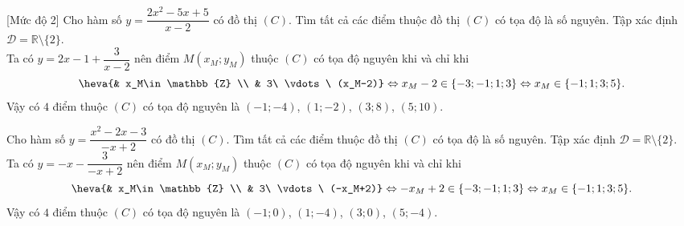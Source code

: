 \begin{bt}%
[Mức độ 2]%
Cho hàm số $y=\dfrac{2x^2-5x+5}{x-2}$ có đồ thị $(C)$. Tìm tất cả các điểm thuộc đồ thị $(C)$ có tọa độ là số nguyên.
\loigiai
{Tập xác định $\mathscr{D}=\mathbb{R}\setminus\{2\}$.\\
Ta có $y=2x-1+\dfrac{3}{x-2}$ nên điểm $M(x_M;y_M)$ thuộc $(C)$ có tọa độ nguyên khi và chỉ khi \[\heva{& x_M\in\mathbb{Z} \\ & 3\ \vdots\ (x_M-2)}\Leftrightarrow x_M-2\in\{-3;-1;1;3\}\Leftrightarrow x_M\in\{-1;1;3;5\}.
\]
Vậy có $4$ điểm thuộc $(C)$ có tọa độ nguyên là $(-1;-4)$, $(1;-2)$, $(3;8)$, $(5;10)$.
}
\end{bt}

\begin{bt}%
Cho hàm số $y=\dfrac{x^2-2x-3}{-x+2}$ có đồ thị $(C)$. Tìm tất cả các điểm thuộc đồ thị $(C)$ có tọa độ là số nguyên.
\loigiai
{Tập xác định $\mathscr{D}=\mathbb{R}\setminus\{2\}$.\\
Ta có $y=-x-\dfrac{3}{-x+2}$ nên điểm $M(x_M;y_M)$ thuộc $(C)$ có tọa độ nguyên khi và chỉ khi \[\heva{& x_M\in\mathbb{Z} \\ & 3\ \vdots\ (-x_M+2)}\Leftrightarrow -x_M+2\in\{-3;-1;1;3\}\Leftrightarrow x_M\in\{-1;1;3;5\}.
\]
Vậy có $4$ điểm thuộc $(C)$ có tọa độ nguyên là $(-1;0)$, $(1;-4)$, $(3;0)$, $(5;-4)$.
}
\end{bt}

